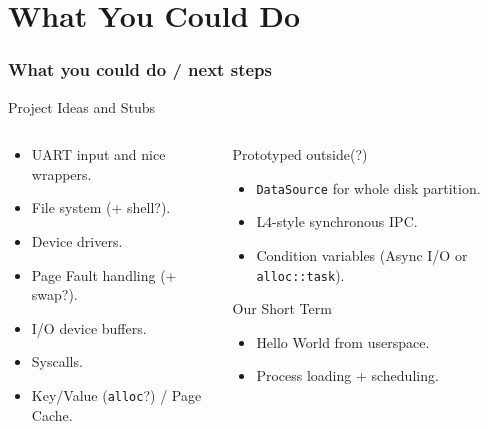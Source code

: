 \documentclass{beamer}
\begin{document}
\section{What You Could Do}
\begin{frame}[fragile]
  \frametitle{What you could do / next steps}
  Project Ideas and Stubs
  \begin{columns}
    \begin{column}{0.5\textwidth}
      \begin{itemize}
      \item UART input and nice wrappers.\\
      \item File system (+ shell?).\\
      \item Device drivers.\\
      \item Page Fault handling (+ swap?).\\
      \item I/O device buffers.\\
      \item Syscalls.\\
      \item Key/Value (\verb_alloc_?) / Page Cache.\\
      \end{itemize}
    \end{column}
    \begin{column}{0.5\textwidth}
      Prototyped outside(?)
      \begin{itemize}
      \item \verb_DataSource_ for whole disk partition.\\
      \item L4-style synchronous IPC.\\
      \item Condition variables (Async I/O or \verb_alloc::task_).\\
      \end{itemize}
      Our Short Term
      \begin{itemize}
      \item Hello World from userspace.\\
      \item Process loading + scheduling.\\
      \end{itemize}
    \end{column}
  \end{columns}
\end{frame}
\end{document}
